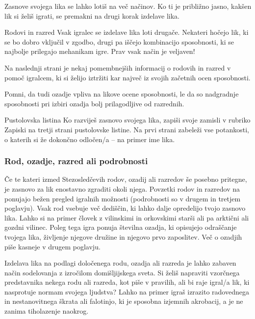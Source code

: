 Zasnove svojega lika se lahko lotiš na več načinov. Ko ti je približno jasno, kakšen lik si želiš igrati, se premakni na drugi korak izdelave lika.

\begin{rpg-titlebox}{Rodovi in razred}
    Vsak igralec se izdelave lika loti drugače. Nekateri hočejo lik, ki se bo dobro vključil v zgodbo, drugi pa iščejo kombinacijo sposobnosti, ki se najbolje prilegajo mehanikam igre. Prav vsak način je veljaven!

    Na naslednji strani je nekaj pomembnejših informacij o rodovih in razred v pomoč igralcem, ki si želijo iztržiti kar največ iz svojih začetnih ocen sposobnosti.

    Pomni, da tudi ozadje vpliva na likove ocene sposobnosti, le da so nadgradnje sposobnosti pri izbiri ozadja bolj prilagodljive od razrednih.
\end{rpg-titlebox}

\begin{rpg-titlebox}{Pustolovska listina}
    Ko razviješ zasnovo svojega lika, zapiši svoje zamisli v rubriko Zapiski na tretji strani pustolovske listine. Na prvi strani zabeleži vse potankosti, o katerih si že dokončno odločen/a -- na primer ime lika.
\end{rpg-titlebox}

\subsubsection{Rod, ozadje, razred ali podrobnosti}
Če te kateri izmed Stezosledčevih rodov, ozadij ali razredov še posebno pritegne, je zasnovo za lik enostavno zgraditi okoli njega. Povzetki rodov in razredov na \pageref{sec:summaries} ponujajo bežen pregled igralnih možnosti (podrobnosti so v drugem in tretjem poglavju). Vsak rod vsebuje več dediščin, ki lahko dalje opredelijo tvojo zasnovo lika. Lahko si na primer človek z vilinskimi in orkovskimi starši ali pa arktični ali gozdni vilinec. Poleg tega igra ponuja številna ozadja, ki opisujejo odraščanje tvojega lika, življenje njegove družine in njegovo prvo zaposlitev. Več o ozadjih piše kasneje v drugem poglavju.

Izdelava lika na podlagi določenega rodu, ozadja ali razreda je lahko zabaven način sodelovanja z izročilom domišljijskega sveta. Si želiš napraviti vzorčnega predstavnika nekega rodu ali razreda, kot piše v pravilih, ali bi raje igral/a lik, ki nasprotuje normam svojega ljudstva? Lahko na primer igraš izrazito radovednega in nestanovitnega škrata ali falotinjo, ki je sposobna izjemnih akrobacij, a je ne zanima tiholazenje naokrog.

